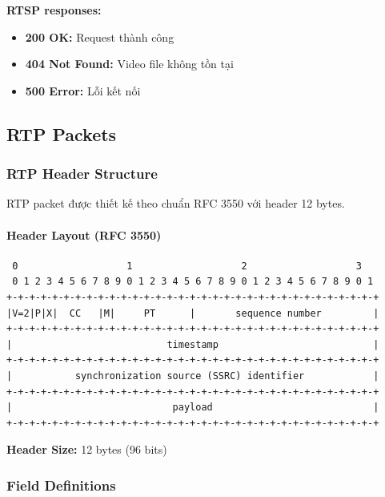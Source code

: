 \textbf{RTSP responses:}
\begin{itemize}
    \item \textbf{200 OK:} Request thành công
    \item \textbf{404 Not Found:} Video file không tồn tại
    \item \textbf{500 Error:} Lỗi kết nối
\end{itemize}

\subsection{RTP Packets}

\subsubsection{RTP Header Structure}

\begin{samepage}
RTP packet được thiết kế theo chuẩn RFC 3550 với header 12 bytes.

\paragraph{Header Layout (RFC 3550)}

\begin{verbatim}
 0                   1                   2                   3
 0 1 2 3 4 5 6 7 8 9 0 1 2 3 4 5 6 7 8 9 0 1 2 3 4 5 6 7 8 9 0 1
+-+-+-+-+-+-+-+-+-+-+-+-+-+-+-+-+-+-+-+-+-+-+-+-+-+-+-+-+-+-+-+-+
|V=2|P|X|  CC   |M|     PT      |       sequence number         |
+-+-+-+-+-+-+-+-+-+-+-+-+-+-+-+-+-+-+-+-+-+-+-+-+-+-+-+-+-+-+-+-+
|                           timestamp                           |
+-+-+-+-+-+-+-+-+-+-+-+-+-+-+-+-+-+-+-+-+-+-+-+-+-+-+-+-+-+-+-+-+
|           synchronization source (SSRC) identifier            |
+-+-+-+-+-+-+-+-+-+-+-+-+-+-+-+-+-+-+-+-+-+-+-+-+-+-+-+-+-+-+-+-+
|                            payload                            |
+-+-+-+-+-+-+-+-+-+-+-+-+-+-+-+-+-+-+-+-+-+-+-+-+-+-+-+-+-+-+-+-+
\end{verbatim}

\textbf{Header Size:} 12 bytes (96 bits)
\end{samepage}

\subsubsection{Field Definitions}

